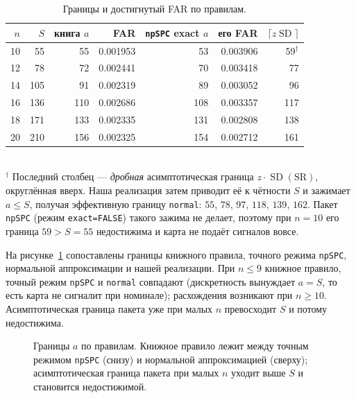 \documentclass[11pt,a4paper]{article}
\newcommand{\SR}{\mathrm{SR}}
\newcommand{\SD}{\operatorname{SD}}
\begin{document}
\begin{table}[htbp]\centering
\caption{Границы и достигнутый FAR по правилам.}
\label{tab:limits}
\small
\begin{tabular}{@{}r r r r r r r@{}}
\toprule
$n$ & $S$ & книга $a$ & FAR & \texttt{npSPC} exact $a$ & его FAR
& $\lceil z\SD\rceil$ \\
\midrule
10 & 55 & 55 & 0.001953 & 53 & 0.003906 & 59$^{\dagger}$ \\
12 & 78 & 72 & 0.002441 & 70 & 0.003418 & 77 \\
14 & 105 & 91 & 0.002319 & 89 & 0.003052 & 96 \\
16 & 136 & 110 & 0.002686 & 108 & 0.003357 & 117 \\
18 & 171 & 133 & 0.002335 & 131 & 0.002808 & 138 \\
20 & 210 & 156 & 0.002325 & 154 & 0.002712 & 161 \\
\bottomrule
\end{tabular}
\normalsize
\\[2pt]
{\footnotesize $^{\dagger}$ Последний столбец --- \emph{дробная}
асимптотическая граница $z\cdot\SD(\SR)$, округлённая вверх. Наша
реализация затем приводит её к чётности $S$ и зажимает $a\le S$, получая
эффективную границу \texttt{normal}: $55$, $78$, $97$, $118$, $139$,
$162$. Пакет \texttt{npSPC} (режим \texttt{exact=FALSE}) такого зажима не
делает, поэтому при $n=10$ его граница $59>S=55$ недостижима и карта не
подаёт сигналов вовсе.}
\end{table}

На рисунке~\ref{fig:limits} сопоставлены границы книжного правила, точного
режима \texttt{npSPC}, нормальной аппроксимации и нашей реализации. При
$n\le9$ книжное правило, точный режим \texttt{npSPC} и \texttt{normal}
совпадают (дискретность вынуждает $a=S$, то есть карта не сигналит при
номинале); расхождения возникают при $n\ge10$. Асимптотическая граница
пакета уже при малых $n$ превосходит $S$ и потому недостижима.

\begin{figure}[htbp]\centering
{}
\caption{Границы $a$ по правилам. Книжное правило лежит между точным
режимом \texttt{npSPC} (снизу) и нормальной аппроксимацией (сверху);
асимптотическая граница пакета при малых $n$ уходит выше $S$ и становится
недостижимой.}
\label{fig:limits}
\end{figure}
\end{document}

